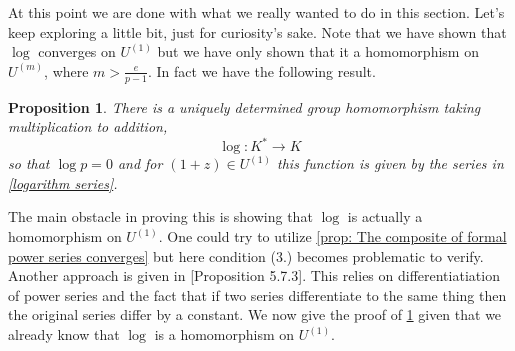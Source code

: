 \documentclass{article}
\newtheorem{proposition}{Proposition}[section]
\numberwithin{equation}{section}
\begin{document}
At this point we are done with what we really wanted to do in this section. Let's keep exploring a little bit, just for curiosity's sake. Note that we have shown that $\log$ converges on $U^{(1)}$ but we have only shown that it a homomorphism on $U^{(m)}$, where $m > \frac{e}{p-1}$. In fact we have the following result. 
\begin{proposition}\label{prop: Improved log}
    There is a uniquely determined group homomorphism taking multiplication to addition,
    $$\log : K^* \to K$$
    so that $\log p = 0$ and for $(1 + z) \in U^{(1)}$ this function is given by the series in \cref{logarithm series}.
\end{proposition}

The main obstacle in proving this is showing that $\log$ is actually a homomorphism on $U^{(1)}$. One could try to utilize \cref{prop: The composite of formal power series converges} but here condition (3.) becomes problematic to verify. Another approach is given in \citep{gouvea}[Proposition 5.7.3]. This relies on differentiatiation of power series and the fact that if two series differentiate to the same thing then the original series differ by a constant. We now give the proof of \cref{prop: Improved log} given that we already know that $\log$ is a homomorphism on $U^{(1)}$.
\end{document}
